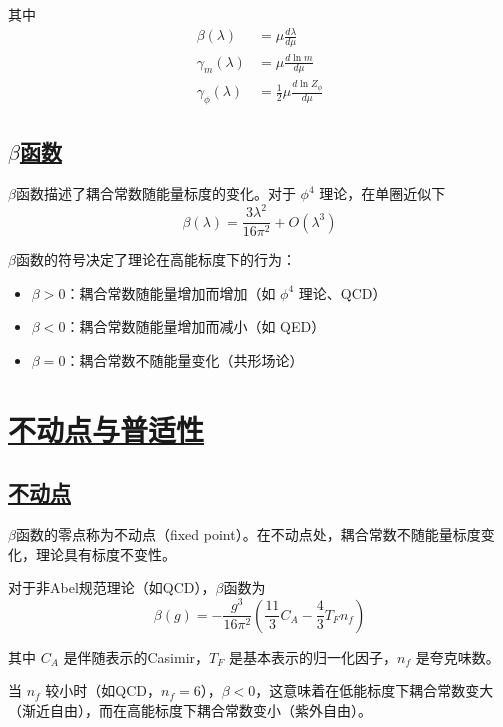 其中
\begin{align}
    \beta(\lambda) &= \mu\frac{d\lambda}{d\mu} \\
    \gamma_m(\lambda) &= \mu\frac{d\ln m}{d\mu} \\
    \gamma_\phi(\lambda) &= \frac{1}{2}\mu\frac{d\ln Z_\phi}{d\mu}
\end{align}

\subsection{\protect\hyperlink{:}{$\beta$函数}}

$\beta$函数描述了耦合常数随能量标度的变化。对于 $\phi^4$ 理论，在单圈近似下
\begin{equation}
    \beta(\lambda) = \frac{3\lambda^2}{16\pi^2} + O(\lambda^3)
\end{equation}

$\beta$函数的符号决定了理论在高能标度下的行为：
\begin{itemize}
    \item $\beta > 0$：耦合常数随能量增加而增加（如 $\phi^4$ 理论、QCD）
    \item $\beta < 0$：耦合常数随能量增加而减小（如 QED）
    \item $\beta = 0$：耦合常数不随能量变化（共形场论）
\end{itemize}

\section{\protect\hyperlink{:}{不动点与普适性}}

\subsection{\protect\hyperlink{:}{不动点}}

$\beta$函数的零点称为不动点（fixed point）。在不动点处，耦合常数不随能量标度变化，理论具有标度不变性。

\begin{example}[QCD的不动点]
    对于非Abel规范理论（如QCD），$\beta$函数为
    \begin{equation*}
        \beta(g) = -\frac{g^3}{16\pi^2}\left(\frac{11}{3}C_A - \frac{4}{3}T_F n_f\right)
    \end{equation*}

    其中 $C_A$ 是伴随表示的Casimir，$T_F$ 是基本表示的归一化因子，$n_f$ 是夸克味数。

    当 $n_f$ 较小时（如QCD，$n_f = 6$），$\beta < 0$，这意味着在低能标度下耦合常数变大（渐近自由），而在高能标度下耦合常数变小（紫外自由）。
\end{example}

